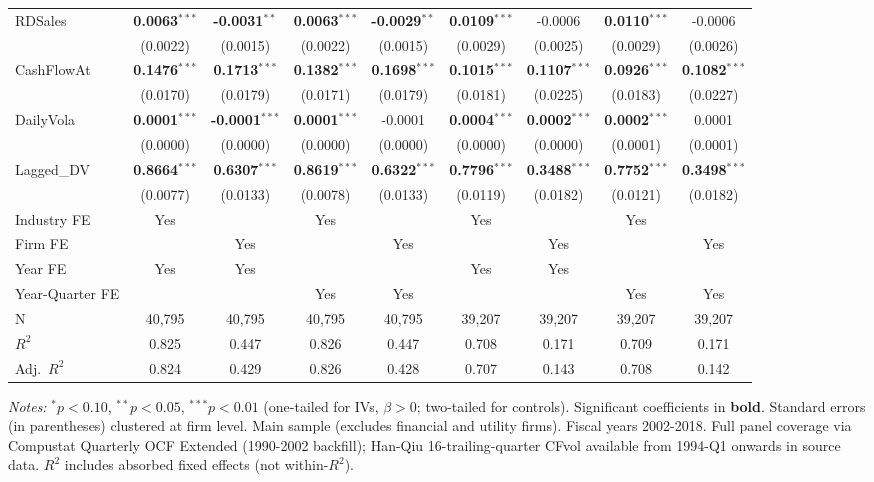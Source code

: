 \documentclass[11pt,a4paper]{article}
\begin{document}
\begin{table}[htbp]
\begin{tabular}{lcccccccc}
RDSales & \textbf{0.0063}$^{***}$ & \textbf{-0.0031}$^{**}$ & \textbf{0.0063}$^{***}$ & \textbf{-0.0029}$^{**}$ & \textbf{0.0109}$^{***}$ & -0.0006 & \textbf{0.0110}$^{***}$ & -0.0006 \\
 & (0.0022) & (0.0015) & (0.0022) & (0.0015) & (0.0029) & (0.0025) & (0.0029) & (0.0026) \\
CashFlowAt & \textbf{0.1476}$^{***}$ & \textbf{0.1713}$^{***}$ & \textbf{0.1382}$^{***}$ & \textbf{0.1698}$^{***}$ & \textbf{0.1015}$^{***}$ & \textbf{0.1107}$^{***}$ & \textbf{0.0926}$^{***}$ & \textbf{0.1082}$^{***}$ \\
 & (0.0170) & (0.0179) & (0.0171) & (0.0179) & (0.0181) & (0.0225) & (0.0183) & (0.0227) \\
DailyVola & \textbf{0.0001}$^{***}$ & \textbf{-0.0001}$^{***}$ & \textbf{0.0001}$^{***}$ & -0.0001 & \textbf{0.0004}$^{***}$ & \textbf{0.0002}$^{***}$ & \textbf{0.0002}$^{***}$ & 0.0001 \\
 & (0.0000) & (0.0000) & (0.0000) & (0.0000) & (0.0000) & (0.0000) & (0.0001) & (0.0001) \\
Lagged\_DV & \textbf{0.8664}$^{***}$ & \textbf{0.6307}$^{***}$ & \textbf{0.8619}$^{***}$ & \textbf{0.6322}$^{***}$ & \textbf{0.7796}$^{***}$ & \textbf{0.3488}$^{***}$ & \textbf{0.7752}$^{***}$ & \textbf{0.3498}$^{***}$ \\
 & (0.0077) & (0.0133) & (0.0078) & (0.0133) & (0.0119) & (0.0182) & (0.0121) & (0.0182) \\
\midrule
Industry FE & Yes &  & Yes &  & Yes &  & Yes &  \\
Firm FE &  & Yes &  & Yes &  & Yes &  & Yes \\
Year FE & Yes & Yes &  &  & Yes & Yes &  &  \\
Year-Quarter FE &  &  & Yes & Yes &  &  & Yes & Yes \\
\midrule
N & 40,795 & 40,795 & 40,795 & 40,795 & 39,207 & 39,207 & 39,207 & 39,207 \\
$R^2$ & 0.825 & 0.447 & 0.826 & 0.447 & 0.708 & 0.171 & 0.709 & 0.171 \\
Adj.~$R^2$ & 0.824 & 0.429 & 0.826 & 0.428 & 0.707 & 0.143 & 0.708 & 0.142 \\
\bottomrule
\end{tabular}
\begin{minipage}{\linewidth}
\vspace{2pt}\scriptsize
\textit{Notes:} $^{*}p<0.10$, $^{**}p<0.05$, $^{***}p<0.01$ (one-tailed for IVs, $\beta > 0$; two-tailed for controls).
 Significant coefficients in \textbf{bold}.
 Standard errors (in parentheses) clustered at firm level.
 Main sample (excludes financial and utility firms). Fiscal years 2002-2018. Full panel coverage via Compustat Quarterly OCF Extended (1990-2002 backfill); Han-Qiu 16-trailing-quarter CFvol available from 1994-Q1 onwards in source data.
 $R^2$ includes absorbed fixed effects (not within-$R^2$).
\end{minipage}
\end{table}
\end{document}
